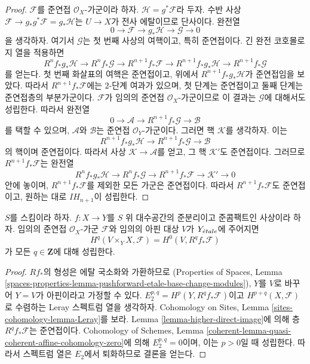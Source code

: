 \begin{proof}
\medskip\noindent
$\mathcal{F}$를 준연접 $\mathcal{O}_X$-가군이라 하자.
$\mathcal{H} = g^*\mathcal{F}$라 두자. 수반 사상
$\mathcal{F} \to g_*g^*\mathcal{F} = g_*\mathcal{H}$는
$U \to X$가 전사 에탈이므로 단사이다. 완전열
$$
0 \to \mathcal{F} \to g_*\mathcal{H} \to \mathcal{G} \to 0
$$
을 생각하자. 여기서 $\mathcal{G}$는 첫 번째 사상의 여핵이고,
특히 준연접이다. 긴 완전 코호몰로지 열을 적용하면
$$
R^nf_*g_*\mathcal{H} \to
R^nf_*\mathcal{G} \to
R^{n + 1}f_*\mathcal{F} \to
R^{n + 1}f_*g_*\mathcal{H} \to
R^{n + 1}f_*\mathcal{G}
$$
를 얻는다. 첫 번째 화살표의 여핵은 준연접이고,
위에서 $R^{n + 1}f_*g_*\mathcal{H}$가 준연접임을 보았다.
따라서 $R^{n + 1}f_*\mathcal{F}$에는 $2$-단계 여과가 있으며,
첫 단계는 준연접이고 둘째 단계는 준연접층의 부분가군이다.
$\mathcal{F}$가 임의의 준연접 $\mathcal{O}_X$-가군이므로
이 결과는 $\mathcal{G}$에 대해서도 성립한다.
따라서 완전열
$$
0 \to \mathcal{A} \to R^{n + 1}f_*\mathcal{G} \to \mathcal{B}
$$
를 택할 수 있으며, $\mathcal{A}$와 $\mathcal{B}$는 준연접
$\mathcal{O}_Y$-가군이다. 그러면 핵 $\mathcal{K}$를 생각하자. 이는
$$
R^{n + 1}f_*g_*\mathcal{H} \to R^{n + 1}f_*\mathcal{G}
\to \mathcal{B}
$$
의 핵이며 준연접이다. 따라서 사상
$\mathcal{K} \to \mathcal{A}$를 얻고, 그 핵 $\mathcal{K}'$도
준연접이다. 그러므로 $R^{n + 1}f_*\mathcal{F}$는 완전열
$$
R^nf_*g_*\mathcal{H} \to
R^nf_*\mathcal{G} \to
R^{n + 1}f_*\mathcal{F} \to \mathcal{K}' \to 0
$$
안에 놓이며, $R^{n + 1}f_*\mathcal{F}$를 제외한 모든 가군은
준연접이다. 따라서 $R^{n + 1}f_*\mathcal{F}$도 준연접이고,
원하는 대로 $IH_{n + 1}$이 성립한다.
\end{proof}















\begin{lemma}
\label{lemma-quasi-coherence-higher-direct-images-application}
$S$를 스킴이라 하자. $f : X \to Y$를 $S$ 위 대수공간의
준분리이고 준콤팩트인 사상이라 하자. 임의의 준연접
$\mathcal{O}_X$-가군 $\mathcal{F}$와 임의의 아핀 대상 $V$가
$Y_{\acute{e}tale}$에 주어지면
$$
H^q(V \times_Y X, \mathcal{F}) = H^0(V, R^qf_*\mathcal{F})
$$
가 모든 $q \in \mathbf{Z}$에 대해 성립한다.
\end{lemma}

\begin{proof}
$Rf_*$의 형성은 에탈 국소화와 가환하므로
(Properties of Spaces, Lemma
\ref{spaces-properties-lemma-pushforward-etale-base-change-modules}),
$Y$를 $V$로 바꾸어 $Y = V$가 아핀이라고 가정할 수 있다.
$E_2^{p, q} = H^p(Y, R^qf_*\mathcal{F})$이고
$H^{p + q}(X, \mathcal{F})$로 수렴하는 Leray 스펙트럼 열을 생각하자.
Cohomology on Sites, Lemma \ref{sites-cohomology-lemma-Leray}를 보라.
Lemma \ref{lemma-higher-direct-image}에 의해 층
$R^qf_*\mathcal{F}$는 준연접이다. Cohomology of Schemes, Lemma
\ref{coherent-lemma-quasi-coherent-affine-cohomology-zero}에 의해
$E_2^{p, q} = 0$이며, 이는 $p > 0$일 때 성립한다.
따라서 스펙트럼 열은 $E_2$에서 퇴화하므로 결론을 얻는다.
\end{proof}




